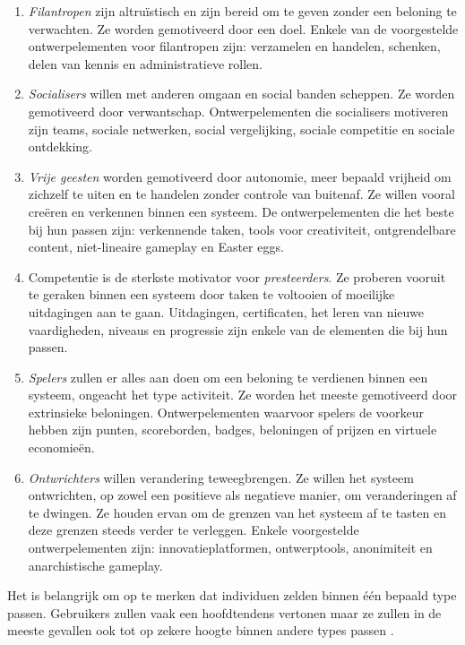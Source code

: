 \begin{enumerate}[label=(\arabic*)]
    \item \textit{Filantropen} zijn altruïstisch en zijn bereid om te geven zonder een beloning te verwachten. Ze worden gemotiveerd door een doel. Enkele van de voorgestelde ontwerpelementen voor filantropen zijn: verzamelen en handelen, schenken, delen van kennis en administratieve rollen.
    \item \textit{Socialisers} willen met anderen omgaan en social banden scheppen. Ze worden gemotiveerd door verwantschap. Ontwerpelementen die socialisers motiveren zijn teams, sociale netwerken, social vergelijking, sociale competitie en sociale ontdekking.
    \item \textit{Vrije geesten} worden gemotiveerd door autonomie, meer bepaald vrijheid om zichzelf te uiten en te handelen zonder controle van buitenaf. Ze willen vooral creëren en verkennen binnen een systeem. De ontwerpelementen die het beste bij hun passen zijn: verkennende taken, tools voor creativiteit, ontgrendelbare content, niet-lineaire gameplay en Easter eggs.
    \item Competentie is de sterkste motivator voor \textit{presteerders}. Ze proberen vooruit te geraken binnen een systeem door taken te voltooien of moeilijke uitdagingen aan te gaan. Uitdagingen, certificaten, het leren van nieuwe vaardigheden, niveaus en progressie zijn enkele van de elementen die bij hun passen.
    \item \textit{Spelers} zullen er alles aan doen om een beloning te verdienen binnen een systeem, ongeacht het type activiteit. Ze worden het meeste gemotiveerd door extrinsieke beloningen. Ontwerpelementen waarvoor spelers de voorkeur hebben zijn punten, scoreborden, badges, beloningen of prijzen en virtuele economieën.
    \item \textit{Ontwrichters} willen verandering teweegbrengen. Ze willen het systeem ontwrichten, op zowel een positieve als negatieve manier, om veranderingen af te dwingen. Ze houden ervan om de grenzen van het systeem af te tasten en deze grenzen steeds verder te verleggen. Enkele voorgestelde ontwerpelementen zijn: innovatieplatformen, ontwerptools, anonimiteit en anarchistische gameplay.
\end{enumerate}

Het is belangrijk om op te merken dat individuen zelden binnen één bepaald type passen. Gebruikers zullen vaak een hoofdtendens vertonen maar ze zullen in de meeste gevallen ook tot op zekere hoogte binnen andere types passen \autocite{Tondello2016}.

